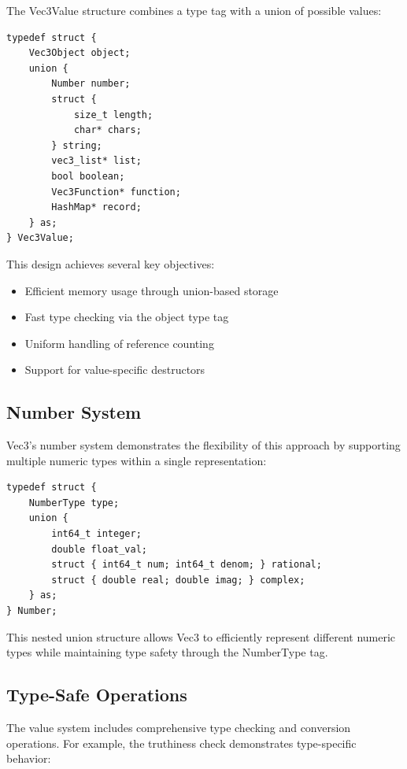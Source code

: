 The Vec3Value structure combines a type tag with a union of possible values:

\begin{verbatim}
typedef struct {
    Vec3Object object;
    union {
        Number number;
        struct {
            size_t length;
            char* chars;
        } string;
        vec3_list* list;
        bool boolean;
        Vec3Function* function;
        HashMap* record;
    } as;
} Vec3Value;
\end{verbatim}

This design achieves several key objectives:

\begin{itemize}[nolistsep]
    \item Efficient memory usage through union-based storage
    \item Fast type checking via the object type tag
    \item Uniform handling of reference counting
    \item Support for value-specific destructors
\end{itemize}

\subsection{Number System}\label{subsec:number-system}

Vec3's number system demonstrates the flexibility of this approach by supporting multiple numeric types within a single representation:

\begin{verbatim}
typedef struct {
    NumberType type;
    union {
        int64_t integer;
        double float_val;
        struct { int64_t num; int64_t denom; } rational;
        struct { double real; double imag; } complex;
    } as;
} Number;
\end{verbatim}

This nested union structure allows Vec3 to efficiently represent different numeric types while maintaining type safety through the NumberType tag.

\subsection{Type-Safe Operations}\label{subsec:type-safe-operations}

The value system includes comprehensive type checking and conversion operations.
For example, the truthiness check demonstrates type-specific behavior:

